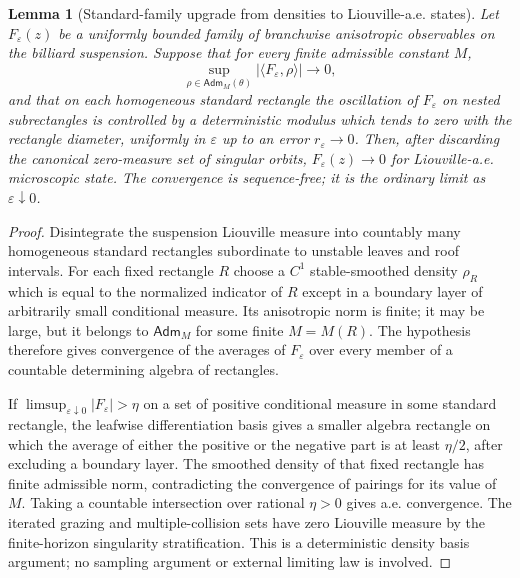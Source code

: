 \documentclass[12pt, letterpaper]{amsart}
\newcommand{\Adm}{\mathsf{Adm}}
\theoremstyle{plain}
\newtheorem{lemma}[theorem]{Lemma}
\theoremstyle{definition}
\theoremstyle{remark}
\begin{document}
\begin{lemma}[Standard-family upgrade from densities to Liouville-a.e. states]
\label{lem:standard_family_pointwise_upgrade}
Let $F_\varepsilon(z)$ be a uniformly bounded family of branchwise anisotropic
observables on the billiard suspension.  Suppose that for every finite
admissible constant $M$,
\begin{equation}
    \sup_{\rho\in\Adm_M(\theta)}
    \left|\langle F_\varepsilon,\rho\rangle\right|\longrightarrow0,
\end{equation}
and that on each homogeneous standard rectangle the oscillation of
$F_\varepsilon$ on nested subrectangles is controlled by a deterministic modulus
which tends to zero with the rectangle diameter, uniformly in $\varepsilon$ up
to an error $r_\varepsilon\to0$.  Then, after discarding the canonical
zero-measure set of singular orbits, $F_\varepsilon(z)\to0$ for
Liouville-a.e. microscopic state.  The convergence is sequence-free; it is the
ordinary limit as $\varepsilon\downarrow0$.
\end{lemma}

\begin{proof}
Disintegrate the suspension Liouville measure into countably many homogeneous
standard rectangles subordinate to unstable leaves and roof intervals.  For
each fixed rectangle $R$ choose a $C^1$ stable-smoothed density $\rho_R$ which
is equal to the normalized indicator of $R$ except in a boundary layer of
arbitrarily small conditional measure.  Its anisotropic norm is finite; it may
be large, but it belongs to $\Adm_M$ for some finite $M=M(R)$.  The hypothesis
therefore gives convergence of the averages of $F_\varepsilon$ over every
member of a countable determining algebra of rectangles.

If $\limsup_{\varepsilon\downarrow0}|F_\varepsilon|>\eta$ on a set of positive
conditional measure in some standard rectangle, the leafwise differentiation
basis gives a smaller algebra rectangle on which the average of either the
positive or the negative part is at least $\eta/2$, after excluding a boundary
layer.  The smoothed density of that fixed rectangle has finite admissible norm,
contradicting the convergence of pairings for its value of $M$.  Taking a
countable intersection over rational $\eta>0$ gives a.e. convergence.  The
iterated grazing and multiple-collision sets have zero Liouville measure by the
finite-horizon singularity stratification.  This is a deterministic density
basis argument; no sampling argument or external limiting law is involved.
\end{proof}
\end{document}
